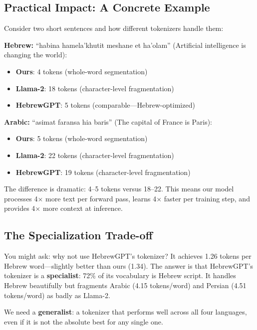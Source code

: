 \documentclass[11pt,a4paper]{article}
\begin{document}
\subsection{Practical Impact: A Concrete Example}

Consider two short sentences and how different tokenizers handle them:

\textbf{Hebrew:} ``habina hamela'khutit meshane et ha'olam'' (Artificial intelligence is changing the world):
\begin{itemize}
    \item \textbf{Ours}: 4 tokens (whole-word segmentation)
    \item \textbf{Llama-2}: 18 tokens (character-level fragmentation)
    \item \textbf{HebrewGPT}: 5 tokens (comparable---Hebrew-optimized)
\end{itemize}

\textbf{Arabic:} ``asimat faransa hia baris'' (The capital of France is Paris):
\begin{itemize}
    \item \textbf{Ours}: 5 tokens (whole-word segmentation)
    \item \textbf{Llama-2}: 22 tokens (character-level fragmentation)
    \item \textbf{HebrewGPT}: 19 tokens (character-level fragmentation)
\end{itemize}

The difference is dramatic: 4--5 tokens versus 18--22. This means our model processes 4$\times$ more text per forward pass, learns 4$\times$ faster per training step, and provides 4$\times$ more context at inference.

\subsection{The Specialization Trade-off}

You might ask: why not use HebrewGPT's tokenizer? It achieves 1.26 tokens per Hebrew word---slightly better than ours (1.34). The answer is that HebrewGPT's tokenizer is a \textbf{specialist}: 72\% of its vocabulary is Hebrew script. It handles Hebrew beautifully but fragments Arabic (4.15 tokens/word) and Persian (4.51 tokens/word) as badly as Llama-2.

We need a \textbf{generalist}: a tokenizer that performs well across all four languages, even if it is not the absolute best for any single one.
\end{document}
